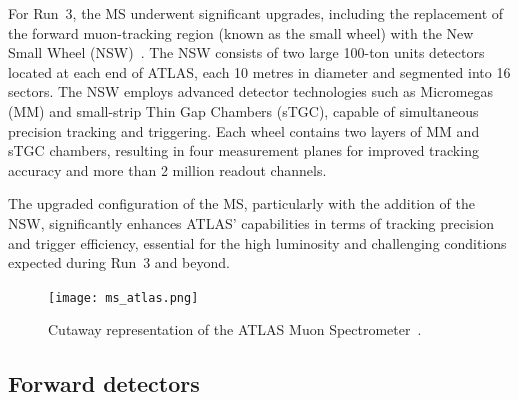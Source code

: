 For Run~3, the MS underwent significant upgrades, including the replacement of the forward muon-tracking region (known as the small wheel) with the New Small Wheel (NSW)~\cite{nsw_tech}. The NSW consists of two large 100-ton units detectors located at each end of ATLAS, each 10 metres in diameter and segmented into 16 sectors. The NSW employs advanced detector technologies such as Micromegas (MM) and small-strip Thin Gap Chambers (sTGC), capable of simultaneous precision tracking and triggering. Each wheel contains two layers of MM and sTGC chambers, resulting in four measurement planes for improved tracking accuracy and more than 2 million readout channels.

The upgraded configuration of the MS, particularly with the addition of the NSW, significantly enhances ATLAS' capabilities in terms of tracking precision and trigger efficiency, essential for the high luminosity and challenging conditions expected during Run~3 and beyond.


\begin{figure}[htbp]
    \centering
        \texttt{[image: ms\_atlas.png]}
    \caption{Cutaway representation of the ATLAS Muon Spectrometer~\cite{ATLAS_run3}.}
    \label{fig:ms_atlas}
\end{figure}

\subsection{Forward detectors}
\label{sec:fwd}

